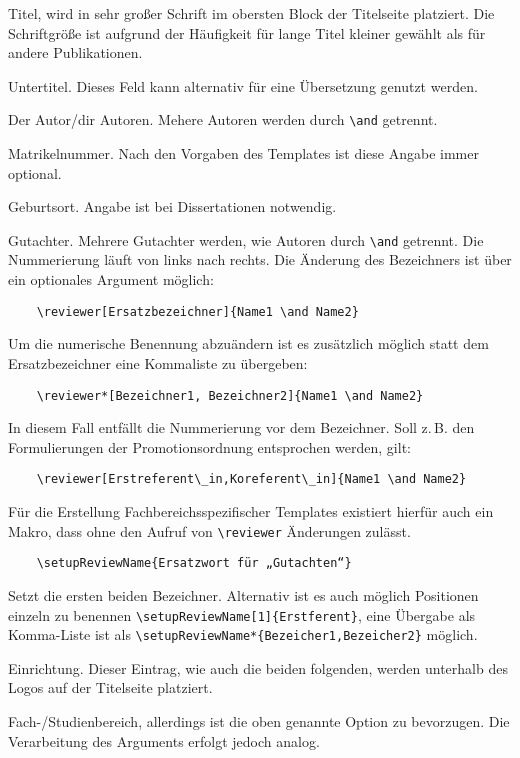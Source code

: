 \documentclass[
	german,%
	ruledheaders=section,%
	class=report,%
	thesis={type=bachelor},%
	accentcolor=9c,%
	custommargins=true,%
	marginpar=false,%
	parskip=half-,%
	fontsize=11pt,%
]{tudapub}
\begin{document}
\begin{description}
	\item[title] Titel, wird in sehr großer Schrift im obersten Block der Titelseite platziert. Die Schriftgröße ist aufgrund der Häufigkeit für lange Titel kleiner gewählt als für andere Publikationen.
	\item[subtitle] Untertitel. Dieses Feld kann alternativ für eine Übersetzung genutzt werden.
	\item[author] Der Autor/dir Autoren. Mehere Autoren werden durch \verb+\and+ getrennt.
	\item[studentID] Matrikelnummer. Nach den Vorgaben des Templates ist diese Angabe immer optional.
	\item[birthplace] Geburtsort. Angabe ist bei Dissertationen notwendig.
	\item[reviewer] Gutachter. Mehrere Gutachter werden, wie Autoren durch \verb+\and+ getrennt. Die Nummerierung läuft von links nach rechts.
	      Die Änderung des Bezeichners ist über ein optionales Argument möglich:
\begin{verbatim}
    \reviewer[Ersatzbezeichner]{Name1 \and Name2}
\end{verbatim}
	      Um die numerische Benennung abzuändern ist es zusätzlich möglich statt dem Ersatzbezeichner eine Kommaliste zu übergeben:
\begin{verbatim}
    \reviewer*[Bezeichner1, Bezeichner2]{Name1 \and Name2}
\end{verbatim}
	      In diesem Fall entfällt die Nummerierung vor dem Bezeichner. Soll z.\,B. den Formulierungen der Promotionsordnung entsprochen werden, gilt:
\begin{verbatim}
    \reviewer[Erstreferent\_in,Koreferent\_in]{Name1 \and Name2}
\end{verbatim}
	      Für die Erstellung Fachbereichsspezifischer Templates existiert hierfür auch ein Makro, dass ohne den Aufruf von \verb+\reviewer+ Änderungen zulässt.
\begin{verbatim}
    \setupReviewName{Ersatzwort für „Gutachten“}
\end{verbatim}
	      Setzt die ersten beiden Bezeichner. Alternativ ist es auch möglich Positionen einzeln zu benennen \verb+\setupReviewName[1]{Erstferent}+, eine Übergabe als Komma-Liste ist als \verb+\setupReviewName*{Bezeicher1,Bezeicher2}+ möglich.
	\item[institution] Einrichtung. Dieser Eintrag, wie auch die beiden folgenden, werden unterhalb des Logos auf der Titelseite platziert.
	\item[department] Fach-/Studienbereich, allerdings ist die oben genannte Option zu bevorzugen. Die Verarbeitung des Arguments erfolgt jedoch analog.


\end{description}
\end{document}

